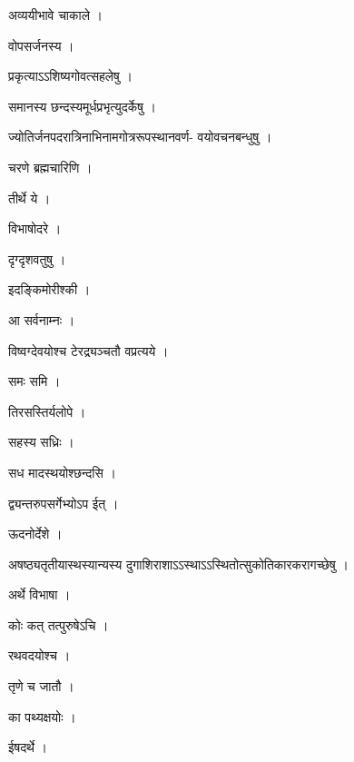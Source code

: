 \documentclass[10pt, openany]{book}
\begin{document}
\noindent अव्ययीभावे चाकाले ।

\noindent वोपसर्जनस्य ।

\noindent प्रकृत्याऽऽशिष्यगोवत्सहलेषु ।

\noindent समानस्य छन्दस्यमूर्धप्रभृत्युदर्केषु ।

\noindent ज्योतिर्जनपदरात्रिनाभिनामगोत्ररूपस्थानवर्ण- वयोवचनबन्धुषु ।

\noindent चरणे ब्रह्मचारिणि ।

\noindent तीर्थे ये ।

\noindent विभाषोदरे ।

\noindent दृग्दृशवतुषु ।

\noindent इदङ्किमोरीश्की ।

\noindent आ सर्वनाम्नः ।

\noindent विष्वग्देवयोश्च टेरद्र्यञ्चतौ वप्रत्यये ।

\noindent समः समि ।

\noindent तिरसस्तिर्यलोपे ।

\noindent सहस्य सध्रिः ।

\noindent सध मादस्थयोश्छन्दसि ।

\noindent द्व्यन्तरुपसर्गेभ्योऽप ईत् ।

\noindent ऊदनोर्देशे ।

\noindent अषष्ठ्यतृतीयास्थस्यान्यस्य दुगाशिराशाऽऽस्थाऽऽस्थितोत्सुकोतिकारकरागच्छेषु ।

\noindent अर्थे विभाषा ।

\noindent कोः कत् तत्पुरुषेऽचि ।

\noindent रथवदयोश्च ।

\noindent तृणे च जातौ ।

\noindent का पथ्यक्षयोः ।

\noindent ईषदर्थे ।
\end{document}
